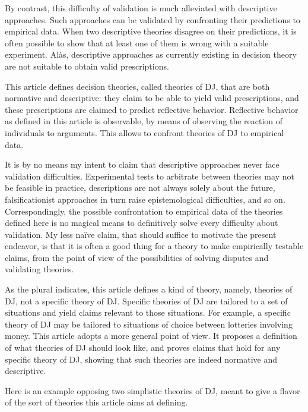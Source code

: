 \documentclass[version=last, pagesize, twoside=off, bibliography=totoc, DIV=calc, fontsize=12pt, a4paper, french, english]{scrartcl}
\begin{document}
By contrast, this difficulty of validation is much alleviated with descriptive approaches. Such approaches can be validated by confronting their predictions to empirical data. When two descriptive theories disagree on their predictions, it is often possible to show that at least one of them is wrong with a suitable experiment. 
Alàs, descriptive approaches as currently existing in decision theory are not suitable to obtain valid prescriptions.

This article defines decision theories, called theories of \ac{DJ}, that are both normative and descriptive: they claim to be able to yield valid prescriptions, and these prescriptions are claimed to predict reflective behavior. Reflective behavior as defined in this article is observable, by means of observing the reaction of individuals to arguments. This allows to confront theories of \ac{DJ} to empirical data.

It is by no means my intent to claim that descriptive approaches never face validation difficulties. Experimental tests to arbitrate between theories may not be feasible in practice, descriptions are not always solely about the future, falsificationist approaches in turn raise epistemological difficulties, and so on. Correspondingly, the possible confrontation to empirical data of the theories defined here is no magical means to definitively solve every difficulty about validation. My less naïve claim, that should suffice to motivate the present endeavor, is that it is often a good thing for a theory to make empirically testable claims, from the point of view of the possibilities of solving disputes and validating theories.

As the plural indicates, this article defines a kind of theory, namely, theories of \ac{DJ}, not a specific theory of \ac{DJ}. Specific theories of \ac{DJ} are tailored to a set of situations and yield claims relevant to those situations. For example, a specific theory of \ac{DJ} may be tailored to situations of choice between lotteries involving money. This article adopts a more general point of view. It proposes a definition of what theories of \ac{DJ} should look like, and proves claims that hold for any specific theory of \ac{DJ}, showing that such theories are indeed normative and descriptive.

Here is an example opposing two simplistic theories of \ac{DJ}, meant to give a flavor of the sort of theories this article aims at defining.
\end{document}
